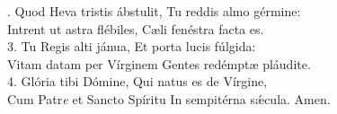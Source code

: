 . Quod Heva tristis ábstulit, Tu reddis almo gérmine:\\
Intrent ut astra flébiles, Cæli fenéstra facta es.\\

3. Tu Regis alti jánua, Et porta lucis fúlgida:\\
Vitam datam per Vírginem Gentes redémptæ pláudite.\\

4. Glória tibi Dómine, Qui natus es de Vírgine,\\
Cum Patr\textit{e} et Sancto Spíritu In sempitérna sǽcula. Amen.
